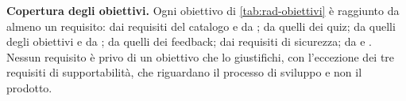\begin{nota}
\textbf{Copertura degli obiettivi.} Ogni obiettivo di
\cref{tab:rad-obiettivi} è raggiunto da almeno un requisito:  dai
requisiti del catalogo e da ;  da quelli dei quiz;
 da quelli degli obiettivi e da ;  da
quelli dei feedback;  dai requisiti di sicurezza;  da
 e . Nessun requisito è privo di un obiettivo che
lo giustifichi, con l'eccezione dei tre requisiti di supportabilità, che
riguardano il processo di sviluppo e non il prodotto.
\end{nota}
